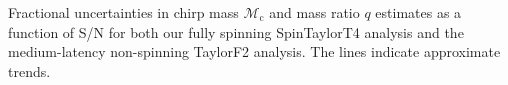 \label{fig:Mc_q_std_snr} Fractional uncertainties in chirp mass $\mathcal{M}_\mathrm{c}$ and mass ratio $q$ estimates as a function of S/N for both our fully spinning SpinTaylorT4 analysis and the medium-latency non-spinning TaylorF2 analysis. The lines indicate approximate trends.
  
  
  